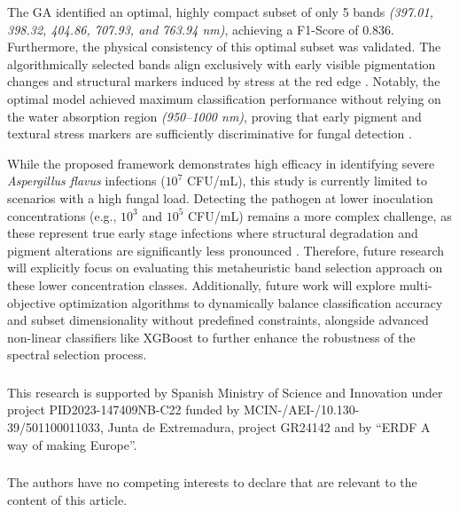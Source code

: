 \documentclass[runningheads]{llncs}
\begin{document}
The GA identified an optimal, highly compact subset of only 5 bands \textit{(397.01, 398.32, 404.86, 707.93, and 763.94 nm)}, achieving a F1-Score of 0.836. 
Furthermore, the physical consistency of this optimal subset was validated. The algorithmically selected bands align exclusively with early visible pigmentation changes and structural markers induced by stress at the red edge \cite{mahlein_plant_2016}. Notably, the optimal model achieved maximum classification performance without relying on the water absorption region \textit{(950–1000 nm)}, proving that early pigment and textural stress markers are sufficiently discriminative for fungal detection \cite{nicolai_nondestructive_2007}. 

While the proposed framework demonstrates high efficacy in identifying severe \textit{Aspergillus flavus} infections ($10^7$ CFU/mL), this study is currently limited to scenarios with a high fungal load. Detecting the pathogen at lower inoculation concentrations (e.g., $10^3$ and $10^5$ CFU/mL) remains a more complex challenge, as these represent true early stage infections where structural degradation and pigment alterations are significantly less pronounced \cite{cruz-carrasco_detection_2024}. Therefore, future research will explicitly focus on evaluating this metaheuristic band selection approach on these lower concentration classes. Additionally, future work will explore multi-objective optimization algorithms to dynamically balance classification accuracy and subset dimensionality without predefined constraints, alongside advanced non-linear classifiers like XGBoost to further enhance the robustness of the spectral selection process.

\begin{credits}
\subsubsection{\ackname} This research is supported by Spanish Ministry of Science and Innovation under project PID2023-147409NB-C22 funded by MCIN-/AEI-/10.130-39/501100011033, Junta de Extremadura, project GR24142 and by “ERDF A way of making Europe”.

\subsubsection{\discintname}
The authors have no competing interests to declare that are
relevant to the content of this article.
\end{credits}



\end{document}
